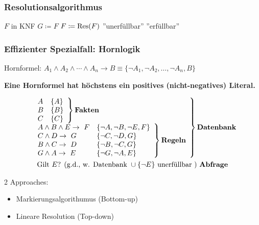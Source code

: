 \subsubsection{Resolutionsalgorithmus}
\begin{algorithmic}
\REQUIRE $F$ in KNF
\REPEAT
	\STATE $G \coloneqq F$
	\STATE $F \coloneqq \Res( F )$
	\PRINT ''unerfüllbar''
\ELSE
	\PRINT ''erfüllbar''
\ENDIF
\end{algorithmic}

\subsubsection{Effizienter Spezialfall: Hornlogik}
Hornformel: $A_1 \wedge A_2 \wedge \dotsb \wedge A_n \rightarrow B \equiv \{ \neg A_1 , \neg A_2 , \dotsc , \neg A_n , B \}$ \\
\begin{def*}[note = Hornformel , index = Hornformel]
	\textbf{Eine Hornformel hat höchstens ein positives (nicht-negatives) Literal.}
\end{def*}
\begin{bsp*}
	\begin{gather*}
		\left.\begin{array}{ l }
			\left.\begin{array}{ l l }
				A							& \{ A \}					\\
				B							& \{ B \}					\\
				C							& \{ C \}					
			\end{array} \right\} \textbf{Fakten}	\\
			\left.\begin{array}{ l l }
				A \wedge B \wedge E \rightarrow F	& \{ \neg A , \neg B , \neg E , F \}	\\
				C \wedge D  \rightarrow G			& \{ \neg C , \neg D , G \}		\\
				B \wedge C  \rightarrow D			& \{ \neg B , \neg C , G \}		\\
				G \wedge A  \rightarrow E			& \{ \neg G , \neg A , E \}		
			\end{array} \right\} \textbf{Regeln}
		\end{array} \right\} \textbf{Datenbank}	\\
		\text{Gilt } E \text{? (\gdw Datenbank } \cup \{ \neg E \} \text{ unerfüllbar ) } \textbf{Abfrage}
	\end{gather*}
\end{bsp*}
2 Approaches:
\begin{itemize}
	\item Markierungsalgorithumus (Bottom-up)
	\item Lineare Resolution (Top-down)
\end{itemize}
